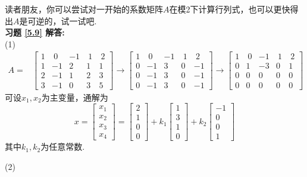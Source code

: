 读者朋友，你可以尝试对一开始的系数矩阵$A$在模2下计算行列式，也可以更快得出$A$是可逆的，试一试吧.\\
\textbf{习题 \ref{5.9} 解答:}\\
(1)
\begin{displaymath}
\begin{aligned}
A=&\begin{bmatrix} 1&\ 0&-1&\ 1&\ 2\\1&-1&2&1&1\\2&-1&1&2&3\\3&-1&0&3&5  \end{bmatrix}\rightarrow
\begin{bmatrix}1&\ 0&-1&\ 1&\ 2\\0&-1&3&0&-1\\0&-1&3&0&-1\\0&-1&3&0&-1   \end{bmatrix}\rightarrow
\begin{bmatrix} 1&\ 0&-1&\ 1&\ 2\\0&1&-3&0&1\\0&0&0&0&0\\0&0&0&0&0  \end{bmatrix}\end{aligned} \end{displaymath}
可设$x_1,x_2$为主变量，通解为
\begin{displaymath}
x=\begin{bmatrix}x_1\\x_2\\x_3\\x_4\end{bmatrix}=\begin{bmatrix}2\\1\\0\\0\end{bmatrix}
+k_1\begin{bmatrix}1\\3\\1\\0\end{bmatrix}+k_2\begin{bmatrix}-1\\0\\0\\1\end{bmatrix}
\end{displaymath}
其中$k_1,k_2$为任意常数.

(2)

